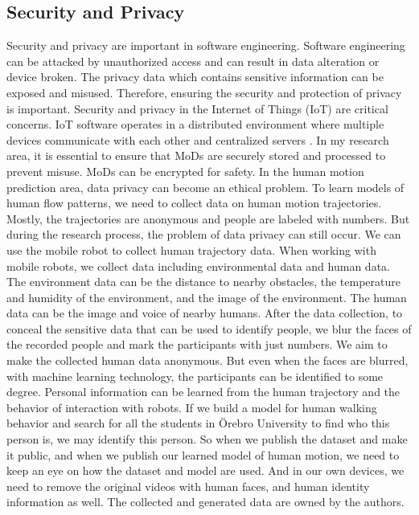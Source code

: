 \documentclass[11pt]{article}
\begin{document}
\subsection{Security and Privacy}
Security and privacy are important in software engineering. Software engineering can be attacked by unauthorized access and can result in data alteration or device broken. The privacy data which contains sensitive information can be exposed and misused. Therefore, ensuring the security and protection of privacy is important. Security and privacy in the Internet of Things (IoT) are critical concerns. IoT software operates in a distributed environment where multiple devices communicate with each other and centralized servers \cite{securityprivacy}. In my research area, it is essential to ensure that MoDs are securely stored and processed to prevent misuse. MoDs can be encrypted for safety.  In the human motion prediction area, data privacy can become an ethical problem. To learn models of human flow patterns, we need to collect data on human motion trajectories. Mostly, the trajectories are anonymous and people are labeled with numbers. But during the research process, the problem of data privacy can still occur. We can use the mobile robot to collect human trajectory data. When working with mobile robots, we collect data including environmental data and human data. The environment data can be the distance to nearby obstacles, the temperature and humidity of the environment, and the image of the environment. The human data can be the image and voice of nearby humans. After the data collection, to conceal the sensitive data that can be used to identify people, we blur the faces of the recorded people and mark the participants with just numbers. We aim to make the collected human data anonymous. But even when the faces are blurred, with machine learning technology, the participants can be identified to some degree. Personal information can be learned from the human trajectory and the behavior of interaction with robots. If we build a model for human walking behavior and search for all the students in Örebro University to find who this person is, we may identify this person. So when we publish the dataset and make it public, and when we publish our learned model of human motion, we need to keep an eye on how the dataset and model are used. And in our own devices, we need to remove the original videos with human faces, and human identity information as well. The collected and generated data are owned by the authors. 
\end{document}
